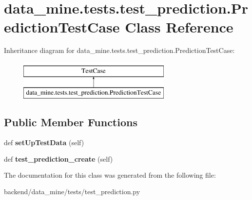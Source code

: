 \hypertarget{classdata__mine_1_1tests_1_1test__prediction_1_1_prediction_test_case}{}\section{data\+\_\+mine.\+tests.\+test\+\_\+prediction.\+Prediction\+Test\+Case Class Reference}
\label{classdata__mine_1_1tests_1_1test__prediction_1_1_prediction_test_case}
Inheritance diagram for data\+\_\+mine.\+tests.\+test\+\_\+prediction.\+Prediction\+Test\+Case\+:\begin{figure}[H]
\begin{center}
\leavevmode
\includegraphics[height=2.000000cm]{classdata__mine_1_1tests_1_1test__prediction_1_1_prediction_test_case}
\end{center}
\end{figure}
\subsection*{Public Member Functions}
\begin{DoxyCompactItemize}
\item 
\mbox{\label{classdata__mine_1_1tests_1_1test__prediction_1_1_prediction_test_case_a2e5006a91ee460cb1377c9cc676bd9bb}} 
def {\bfseries set\+Up\+Test\+Data} (self)
\item 
\mbox{\label{classdata__mine_1_1tests_1_1test__prediction_1_1_prediction_test_case_abdfa5c1feb683aea3b67d15364770b5f}} 
def {\bfseries test\+\_\+prediction\+\_\+create} (self)
\end{DoxyCompactItemize}


The documentation for this class was generated from the following file\+:\begin{DoxyCompactItemize}
\item 
backend/data\+\_\+mine/tests/test\+\_\+prediction.\+py\end{DoxyCompactItemize}
